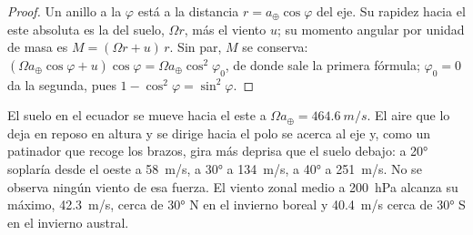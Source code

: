 \begin{proof}
Un anillo a la  $\varphi$ está a la distancia $r = a_\oplus\cos\varphi$ del eje. Su rapidez hacia el este absoluta es la del suelo, $\Omega r$, más el viento
$u$; su momento angular por unidad de masa es $M = (\Omega r + u)\,r$. Sin par, $M$ se conserva: $(\Omega a_\oplus\cos\varphi + u)\cos\varphi = \Omega a_\oplus
\cos^2\varphi_0$, de donde sale la primera fórmula; $\varphi_0 = 0$ da la segunda, pues $1 - \cos^2\varphi = \sin^2\varphi$.
\end{proof}

El suelo en el ecuador se mueve hacia el este a $\Omega a_\oplus = \qty{464.6}{m/s}$. El aire que lo deja en reposo en altura y se dirige hacia el polo se acerca al eje y, como un patinador que recoge los brazos, gira más deprisa que el suelo debajo: a \ang{20} soplaría desde el oeste a \qty{58}{m/s}, a \ang{30} a \qty{134}{m/s}, a \ang{40} a \qty{251}{m/s}. No se observa ningún viento de esa fuerza. El viento zonal medio a \qty{200}{hPa} alcanza su máximo, \qty{42.3}{m/s}, cerca de \ang{30} N en el invierno boreal y \qty{40.4}{m/s} cerca de \ang{30} S en el invierno austral.

